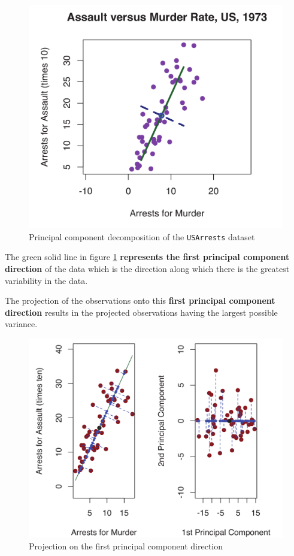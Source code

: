 \documentclass[11pt]{article}
\theoremstyle{definition}
\newcommand*\predvar[1]{{\color{SeaGreen4} \texttt{#1}}}
\begin{document}
\begin{figure}[H]
	\centering
	\includegraphics[width=0.6\linewidth]{img/Principal_component_analysis}
	\caption{Principal component decomposition of the \predvar{USArrests} dataset}
	\label{fig:principalcomponentanalysis}
\end{figure}

The green solid line in figure \ref{fig:principalcomponentanalysis} \textbf{represents the first principal component direction} of the data which is the direction along which there is the greatest variability in the data.

The projection of the observations onto this \textbf{ first principal component direction} results in the projected observations having the largest possible variance.

\begin{figure}[H]
	\centering
	\includegraphics[width=0.6\linewidth]{img/Principal_component_analysis02}
	\caption{Projection on the first principal component direction}
	\label{fig:principalcomponentanalysis02}
\end{figure}
\end{document}

